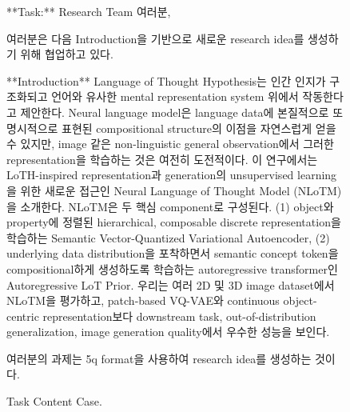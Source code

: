 \begin{figure}[htbp]
\centering
\begin{tcolorbox}[colback=blue!2!white, colframe=gray!50!blue]
\begin{minipage}{\linewidth}
\small
**Task:**
Research Team 여러분,

여러분은 다음 Introduction을 기반으로 새로운 research idea를 생성하기 위해 협업하고 있다.

**Introduction**
Language of Thought Hypothesis는 인간 인지가 구조화되고 언어와 유사한 mental representation system 위에서 작동한다고 제안한다. Neural language model은 language data에 본질적으로 또 명시적으로 표현된 compositional structure의 이점을 자연스럽게 얻을 수 있지만, image 같은 non-linguistic general observation에서 그러한 representation을 학습하는 것은 여전히 도전적이다. 이 연구에서는 LoTH-inspired representation과 generation의 unsupervised learning을 위한 새로운 접근인 Neural Language of Thought Model (NLoTM)을 소개한다. NLoTM은 두 핵심 component로 구성된다. (1) object와 property에 정렬된 hierarchical, composable discrete representation을 학습하는 Semantic Vector-Quantized Variational Autoencoder, (2) underlying data distribution을 포착하면서 semantic concept token을 compositional하게 생성하도록 학습하는 autoregressive transformer인 Autoregressive LoT Prior. 우리는 여러 2D 및 3D image dataset에서 NLoTM을 평가하고, patch-based VQ-VAE와 continuous object-centric representation보다 downstream task, out-of-distribution generalization, image generation quality에서 우수한 성능을 보인다.

여러분의 과제는 5q format을 사용하여 research idea를 생성하는 것이다.
\end{minipage}
\end{tcolorbox}
\caption{Task Content Case.}
\label{fig:task-content-case}
\end{figure}

